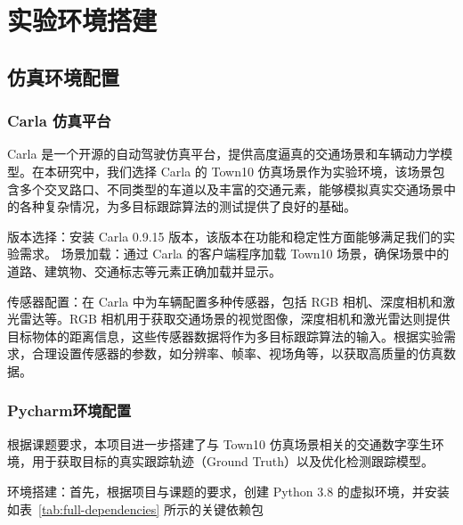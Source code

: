 \chapter{实验环境搭建}

\section{仿真环境配置}

\subsection{Carla 仿真平台}

Carla 是一个开源的自动驾驶仿真平台，提供高度逼真的交通场景和车辆动力学模型。在本研究中，我们选择 Carla 的 Town10 仿真场景作为实验环境，该场景包含多个交叉路口、不同类型的车道以及丰富的交通元素，能够模拟真实交通场景中的各种复杂情况，为多目标跟踪算法的测试提供了良好的基础\cite{卢嘉伟 2025 复杂环境下自动驾驶汽车视觉目标检测模型性能评估}。

版本选择：安装 Carla 0.9.15 版本，该版本在功能和稳定性方面能够满足我们的实验需求。
场景加载：通过 Carla 的客户端程序加载 Town10 场景，确保场景中的道路、建筑物、交通标志等元素正确加载并显示。

传感器配置：在 Carla 中为车辆配置多种传感器，包括 RGB 相机、深度相机和激光雷达等。RGB 相机用于获取交通场景的视觉图像，深度相机和激光雷达则提供目标物体的距离信息，这些传感器数据将作为多目标跟踪算法的输入。根据实验需求，合理设置传感器的参数，如分辨率、帧率、视场角等，以获取高质量的仿真数据\cite{田卓灵 2011 自动驾驶}。

\subsection{Pycharm环境配置}
根据课题要求，本项目进一步搭建了与 Town10 仿真场景相关的交通数字孪生环境，用于获取目标的真实跟踪轨迹（Ground Truth）以及优化检测跟踪模型。

环境搭建：首先，根据项目与课题的要求，创建 Python 3.8 的虚拟环境，并安装如表~\ref{tab:full-dependencies} 所示的关键依赖包

